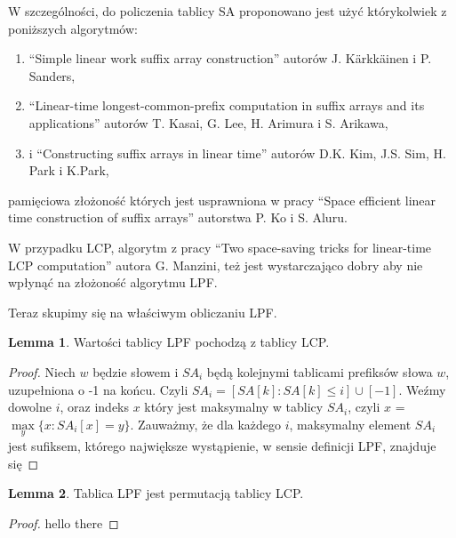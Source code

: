 \documentclass[a4paper,12pt]{article}
\theoremstyle{definition}
\newtheorem{lemma}{Lemma}[section]
\begin{document}
\pagebreak

W szczególności, do policzenia tablicy SA proponowano jest użyć którykolwiek z poniższych algorytmów:
\begin{enumerate}
\item ``Simple linear work suffix array construction'' autorów J. Kärkkäinen i P. Sanders,
\item ``Linear-time longest-common-prefix computation in suffix arrays and its applications'' autorów T. Kasai, G. Lee, H. Arimura i S. Arikawa,
\item i ``Constructing suffix arrays in linear time'' autorów D.K. Kim, J.S. Sim, H. Park i K.Park,
\end{enumerate}
pamięciowa złożoność których jest usprawniona w pracy ``Space efficient linear time construction of suffix arrays'' autorstwa P. Ko i S. Aluru.

W przypadku LCP, algorytm z pracy ``Two space-saving tricks for linear-time LCP computation'' autora G. Manzini,
też jest wystarczająco dobry aby nie wpłynąć na złożoność algorytmu LPF.

Teraz skupimy się na właściwym obliczaniu LPF.

\begin{lemma}

Wartości tablicy LPF pochodzą z tablicy LCP.

\begin{proof}

Niech $w$ będzie słowem i $SA_{i}$ będą kolejnymi tablicami prefiksów słowa $w$, uzupełniona o -1 na końcu.
Czyli $SA_{i} = [ SA[k] : SA[k] \leq i ] \cup [-1]$.
Weźmy dowolne $i$, oraz indeks $x$ który jest maksymalny w tablicy $SA_{i}$, czyli $x$ = $\max\limits_{y} \{ x : SA_{i}[x] = y \}$.
Zauważmy, że dla każdego $i$,
maksymalny element $SA_{i}$ jest sufiksem,
którego największe wystąpienie, w sensie definicji LPF, 
znajduje się

\end{proof}
\end{lemma}

\begin{lemma}

Tablica LPF jest permutacją tablicy LCP.

\begin{proof}

hello there

\end{proof}
\end{lemma}
\end{document}
